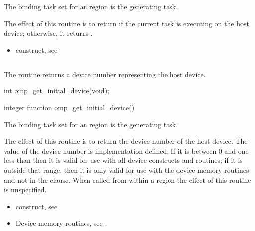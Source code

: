 \binding
The binding task set for an  region is the generating task.

\effect
The effect of this routine is to return  if the current task is executing on the host 
device; otherwise, it returns .

\crossreferences
\begin{itemize}
\item {} construct, see 
\end{itemize}





\subsection{}
\label{subsec:omp_get_initial_device}
\summary
The  routine returns a device number representing
the host device.

\begin{samepage}
\format
\begin{ccppspecific}
\begin{ompcFunction}
int omp_get_initial_device(void);
\end{ompcFunction}
\end{ccppspecific}
\end{samepage}

\begin{fortranspecific}
\begin{ompfFunction}
integer function omp_get_initial_device()
\end{ompfFunction}
\end{fortranspecific}

\binding
The binding task set for an  region is the generating task.

\effect
The effect of this routine is to return the device number of the host device.
The value of the device number is implementation defined. If it is between 0 
and one less than  then it is valid for use 
with all device constructs and routines; if it is outside that range, then 
it is only valid for use with the device memory routines and not in the 
 clause. When called from within a  region 
the effect of this routine is unspecified.

\crossreferences
\begin{itemize}
\item {} construct, see 

\item Device memory routines, see .
\end{itemize}




